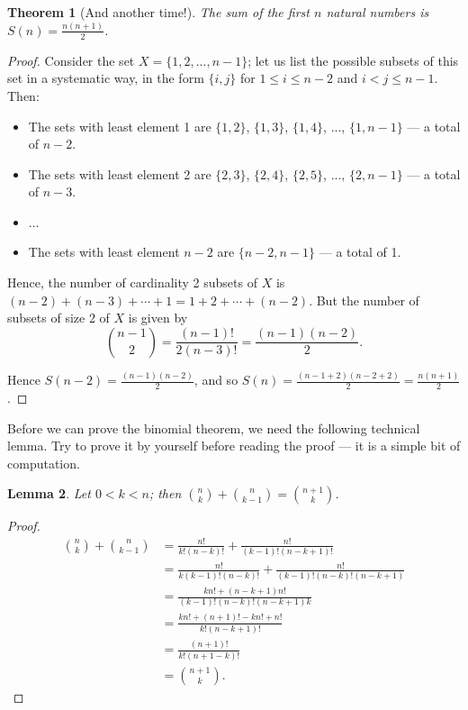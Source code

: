\documentclass[a4paper, 10pt]{amsart}
\newtheorem{thm}{Theorem}[section]
\newtheorem{lem}[thm]{Lemma}
\theoremstyle{definition}
\theoremstyle{remark}
\begin{document}
\begin{thm}[And another time!]\label{ex:w2}
  The sum of the first $ n $ natural numbers is $ S(n) = \frac{n(n+1)}{2} $.
\end{thm}
\begin{proof}
  Consider the set $ X = \{1, 2, ..., n-1\} $; let us list the possible subsets of this set in a systematic way, in the form $ \{i,j\} $
  for $ 1 \leq i \leq n - 2 $ and $ i < j \leq n - 1 $. Then:
  \begin{itemize}
    \item The sets with least element 1 are $ \{1, 2\} $, $ \{1, 3\} $, $ \{1, 4\} $, ..., $ \{1, n-1\} $ --- a total of $ n - 2 $.
    \item The sets with least element 2 are $ \{2, 3\} $, $ \{2, 4\} $, $ \{2, 5\} $, ..., $ \{2, n-1\} $ --- a total of $ n - 3 $.
    \item ...
    \item The sets with least element $ n - 2 $ are $ \{n - 2, n - 1\} $ --- a total of 1.
  \end{itemize}

  Hence, the number of cardinality 2 subsets of $ X $ is $ (n - 2) + (n - 3) + \cdots + 1 = 1 + 2 + \cdots + (n - 2) $. But the number
  of subsets of size 2 of $ X $ is given by
  \begin{displaymath}
    \binom{n - 1}{2} = \frac{(n - 1)!}{2(n - 3)!} = \frac{(n-1)(n-2)}{2}.
  \end{displaymath}

  Hence $ S(n - 2) = \frac{(n-1)(n-2)}{2} $, and so $ S(n) = \frac{(n - 1 + 2)(n - 2 + 2)}{2} = \frac{n(n+1)}{2} $.
\end{proof}

Before we can prove the binomial theorem, we need the following technical lemma. Try to prove it
by yourself before reading the proof --- it is a simple bit of computation.
\begin{lem}
  Let $ 0 < k < n $; then $ \binom{n}{k} + \binom{n}{k - 1} = \binom{n + 1}{k} $.
\end{lem}
\begin{proof}
  \begin{align*}
    \binom{n}{k} + \binom{n}{k - 1} &= \frac{n!}{k! (n - k)!} + \frac{n!}{(k - 1)! (n - k + 1)!}\\
                                    &= \frac{n!}{k(k - 1)! (n - k)!} + \frac{n!}{(k - 1)! (n - k)! (n - k + 1)}\\
                                    &= \frac{kn! + (n - k + 1) n!}{(k - 1)! (n - k)! (n - k + 1)k}\\
                                    &= \frac{kn! + (n + 1)! - kn! + n!}{k!(n - k + 1)!}\\
                                    &= \frac{(n + 1)!}{k!(n + 1 - k)!}\\
                                    &= \binom{n + 1}{k}.
  \end{align*}
\end{proof}
\end{document}
